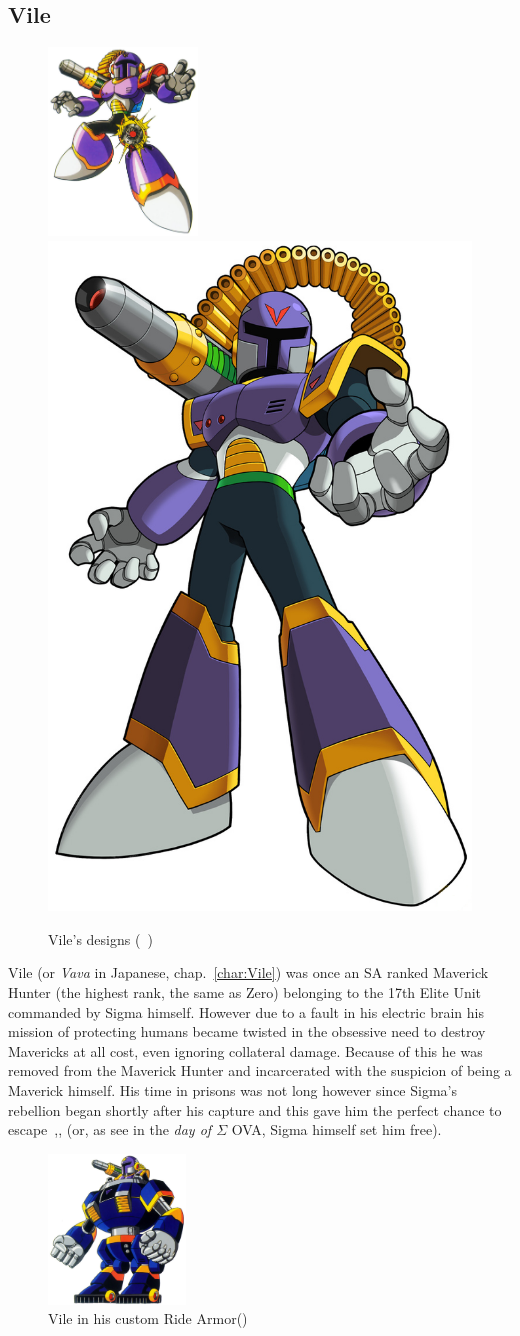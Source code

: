 \subsection{Vile}\label{boss:vile}
\begin{figure}[htp]
	\centering
	\includegraphics[height=5cm]{figures/X1/Sigma_stages/Vile.jpg}
	\includegraphics[width=0.35\linewidth]{figures/X1/Sigma_stages/MhxVile.png}
	\caption{Vile's designs (~\cite{book:MMX_Complete_art})}
\end{figure}
Vile (or \textit{Vava} in Japanese, chap.~\ref{char:Vile}) was once an SA ranked Maverick Hunter (the highest rank, the same as Zero) belonging to the 17th Elite Unit commanded by Sigma himself. However due to a fault in his electric brain his mission of protecting humans became twisted in the obsessive need to destroy Mavericks at all cost, even ignoring collateral damage. Because of this he was removed from the Maverick Hunter and incarcerated with the suspicion of being a Maverick himself. His time in prisons was not long however since Sigma's rebellion began shortly after his capture and this gave him the perfect chance to escape~\cite{Xcoll1:Manual_X1},\cite{MHX:manual},\cite{wayback:X_resources} (or, as see in the \textit{day of $\Sigma$} OVA, Sigma himself set him free). 
\begin{figure}[htp]
	\centering
	\includegraphics[height=4cm]{figures/X1/Sigma_stages/VileRideArmor.jpg}
	\caption{Vile in his custom Ride Armor(\cite{book:MMX_Complete_art})}
\end{figure}

